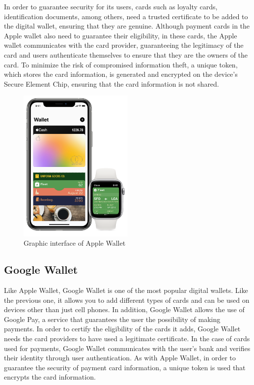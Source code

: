 \documentclass{article}
\begin{document}
In order to guarantee security for its users, cards such as loyalty cards, identification documents, among others, need a trusted certificate to be added to the digital wallet, ensuring that they are genuine.
Although payment cards in the Apple wallet also need to guarantee their eligibility, in these cards, the Apple wallet communicates with the card provider, guaranteeing the legitimacy of the card and users authenticate themselves to ensure that they are the owners of the card. To minimize the risk of compromised information theft, a unique token, which stores the card information, is generated and encrypted on the device's Secure Element Chip, ensuring that the card information is not shared.

\begin{figure}[H]
    \centering
    \includegraphics[width=0.5\textwidth]{images/Apple_Wallet.png}
    \caption{Graphic interface of Apple Wallet}
    \label{fig:my_label}
\end{figure}

\subsection{Google Wallet}
Like Apple Wallet, Google Wallet is one of the most popular digital wallets. Like the previous one, it allows you to add different types of cards and can be used on devices other than just cell phones. In addition, Google Wallet allows the use of Google Pay, a service that guarantees the user the possibility of making payments.
In order to certify the eligibility of the cards it adds, Google Wallet needs the card providers to have used a legitimate certificate. In the case of cards used for payments, Google Wallet communicates with the user's bank and verifies their identity through user authentication. As with Apple Wallet, in order to guarantee the security of payment card information, a unique token is used that encrypts the card information.
\end{document}
